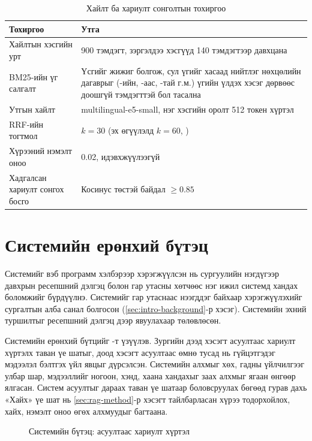 \begin{table}[htbp]
\centering
\caption{Хайлт ба хариулт сонголтын тохиргоо}
\label{tab:search_settings}
\begin{tabular}{|p{5.0cm}|p{8.8cm}|}
\hline
\textbf{Тохиргоо} & \textbf{Утга} \\
\hline
Хайлтын хэсгийн урт & 900 тэмдэгт, зэргэлдээ хэсгүүд 140 тэмдэгтээр давхцана \\
\hline
BM25-ийн үг салгалт & Үсгийг жижиг болгож, сул үгийг хасаад нийтлэг нөхцөлийн дагаврыг (-ийн, -аас, -тай г.м.) үгийн үлдэх хэсэг дөрвөөс доошгүй тэмдэгттэй бол тасална \\
\hline
Утгын хайлт & multilingual-e5-small, нэг хэсгийн оролт 512 токен хүртэл \\
\hline
\acs{RRF}-ийн тогтмол & $k = 30$ (эх өгүүлэлд $k = 60$, \cite{cormack2009rrf}) \\
\hline
Хүрээний нэмэлт оноо & 0.02, идэвхжүүлээгүй \\
\hline
Хадгалсан хариулт сонгох босго & Косинус төстэй байдал $\geq 0.85$ \\
\hline
\end{tabular}
\end{table}

\section{Системийн ерөнхий бүтэц}
\label{sec:system}

Системийг вэб программ хэлбэрээр хэрэгжүүлсэн нь сургуулийн нэгдүгээр давхрын ресепшний дэлгэц болон гар утасны хөтчөөс нэг ижил системд хандах боломжийг бүрдүүлнэ. Системийг гар утаснаас нээгддэг байхаар хэрэгжүүлэхийг сургалтын алба санал болгосон (\ref{sec:intro-background}-р хэсэг). Системийн эхний туршилтыг ресепшний дэлгэц дээр явуулахаар төлөвлөсөн.

Системийн ерөнхий бүтцийг -т үзүүлэв. Зургийн дээд хэсэгт асуултаас хариулт хүртэлх таван үе шатыг, доод хэсэгт асуултаас өмнө тусад нь гүйцэтгэдэг мэдээлэл бэлтгэх үйл явцыг дүрсэлсэн. Системийн алхмыг хөх, гадны үйлчилгээг улбар шар, мэдээллийг ногоон, хэнд, хаана хандахыг заах алхмыг ягаан өнгөөр ялгасан. Систем асуултыг дараах таван үе шатаар боловсруулах бөгөөд гурав дахь «Хайх» үе шат нь \ref{sec:rag-method}-р хэсэгт тайлбарласан хүрээ тодорхойлох, хайх, нэмэлт оноо өгөх алхмуудыг багтаана.

\begin{figure}[ht]
\centering
{}
\caption{Системийн бүтэц: асуултаас хариулт хүртэл}
\label{fig:system}
\end{figure}

